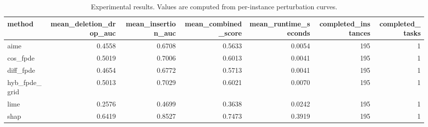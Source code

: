 \begin{table}[t]
\caption{Experimental results. Values are computed from per-instance perturbation curves.}
\label{tab:main_results_computed}
\centering
\begin{tabular}{lrrrrrr}
\toprule
method & mean\_deletion\_drop\_auc & mean\_insertion\_auc & mean\_combined\_score & mean\_runtime\_seconds & completed\_instances & completed\_tasks \\
\midrule
aime & 0.4558 & 0.6708 & 0.5633 & 0.0054 & 195 & 1 \\
cos\_fpde & 0.5019 & 0.7006 & 0.6013 & 0.0041 & 195 & 1 \\
diff\_fpde & 0.4654 & 0.6772 & 0.5713 & 0.0041 & 195 & 1 \\
hyb\_fpde\_grid & 0.5013 & 0.7029 & 0.6021 & 0.0070 & 195 & 1 \\
lime & 0.2576 & 0.4699 & 0.3638 & 0.0242 & 195 & 1 \\
shap & 0.6419 & 0.8527 & 0.7473 & 0.3919 & 195 & 1 \\
\bottomrule
\end{tabular}

\end{table}
